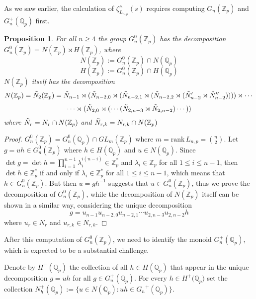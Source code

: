 \documentclass[12pt]{article}
\newtheorem{proposition}[theorem]{Proposition}
\begin{document}
As we saw earlier, the calculation of $\zeta_{L_{n,p}}^{\wedge}(s)$ requires computing $G_{n}(\mathbb{Z}_p)$ and $G_{n}^{+}(\mathbb{Q}_p)$ first. 
\begin{proposition}
\label{prop:G.n.Zp.decomposition}
For all $n\geq{4}$ the group $G_{n}^{0}(\mathbb{Z}_{p})$ has the decomposition $G_{n}^{0}(\mathbb{Z}_{p})=N(\mathbb{Z}_{p})\rtimes{H(\mathbb{Z}_{p})}$, where \[N(\mathbb{Z}_{p}):=G_{n}^{0}(\mathbb{Z}_{p})\cap{N(\mathbb{Q}_{p})}\]
\[H(\mathbb{Z}_{p}):=G_{n}^{0}(\mathbb{Z}_{p})\cap{H(\mathbb{Q}_{p})}\]
$N(\mathbb{Z}_{p})$ itself has the decomposition \[N(\mathbb{Z}_{p})=\Tilde{N}_{2}(\mathbb{Z}_{p})=
\Tilde{N}_{n-1}\rtimes({\Tilde{N}_{n-2,0}}\rtimes(\Tilde{N}_{n-2,1}\rtimes(\Tilde{N}_{n-2,2}\rtimes(\Tilde{N}'_{n-2}\rtimes{\Tilde{N}''_{n-2}}))))\rtimes\cdots\]\[\cdots\rtimes{(\Tilde{N}_{2,0}\rtimes(\cdots(\Tilde{N}_{2,n-3}\rtimes{\Tilde{N}_{2,n-2}})\cdots))}
\]
where $\Tilde{N}_{r}=N_{r}\cap{N(\mathbb{Z}_{p})}$ and $\Tilde{N}_{r,k}=N_{r,k}\cap{N(\mathbb{Z}_{p})}$
\end{proposition}
\begin{proof}
$G_{n}^{0}(\mathbb{Z}_{p})=G_{n}^{0}(\mathbb{Q}_{p})\cap{GL_{m}(\mathbb{Z}_{p})}$ where $m=\mathrm{rank}\,L_{n,p}=\binom{n}{2}$. Let $g=uh\in{G_{n}^{0}(\mathbb{Z}_{p})}$ where $h\in{H(\mathbb{Q}_{p})}$ and $u\in{N(\mathbb{Q}_{p})}$. Since $\det{g}=\det{h}=\prod_{i=1}^{n-1}\lambda_i^{i(n-i)}\in\mathbb{Z}_{p}^{\ast}$ and $\lambda_{i}\in\mathbb{Z}_{p}$ for all $1\leq{i}\leq{n-1}$, then $\det{h}\in\mathbb{Z}_{p}^{\ast}$ if and only if $\lambda_{i}\in\mathbb{Z}_{p}^{\ast}$ for all $1\leq{i}\leq{n-1}$, which means that $h\in{G_{n}^{0}(\mathbb{Z}_{p})}$. But then $u=gh^{-1}$ suggests that $u\in{G_{n}^{0}(\mathbb{Z}_{p})}$, thus we prove the decomposition of $G_{n}^{0}(\mathbb{Z}_{p})$, while the decomposition of $N(\mathbb{Z}_{p})$ itself can be shown in a similar way, considering the unique decomposition \[g=u_{n-1}u_{n-2,0}u_{n-2,1}\cdots{u_{2,n-3}u_{2,n-2}h}\]
where $u_{r}\in{N_{r}}$ and $u_{r,k}\in{N_{r,k}}$.
\end{proof}
After this computation of $G_{n}^{0}(\mathbb{Z}_{p})$, we need to identify the monoid $G_{n}^{+}(\mathbb{Q}_p)$, which is expected to be a substantial challenge.

Denote by $H^+(\mathbb{Q}_p)$ the collection of all $h\in H(\mathbb{Q}_p)$ that appear in the unique decomposition $g=uh$ for all $g\in G_{n}^{+}(\mathbb{Q}_p)$. For every $h\in{H^{+}(\mathbb{Q}_{p}})$ set the collection $N_h^+(\mathbb{Q}_p):=\{u\in N(\mathbb{Q}_p) : uh\in{G_{n}}^+(\mathbb{Q}_p)\}$.
\end{document}
